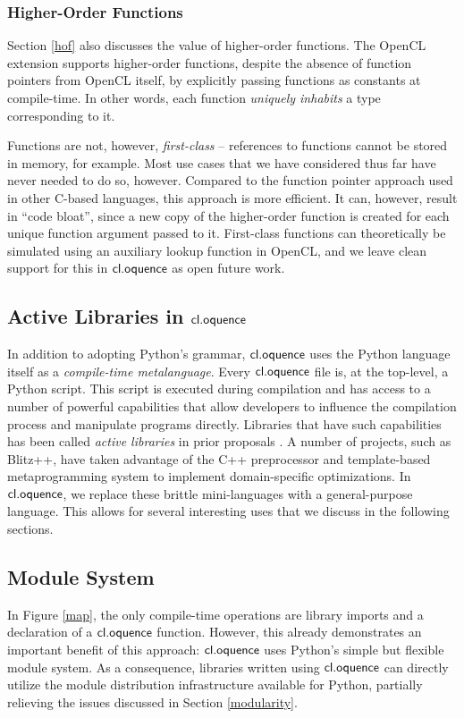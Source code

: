 \documentclass[10pt, conference, compsocconf]{IEEEtran}
\begin{document}
\subsubsection{Higher-Order Functions}
Section \ref{hof} also discusses the value of higher-order functions. The OpenCL extension supports higher-order functions, despite the absence of function pointers from OpenCL itself, by explicitly passing functions as constants at compile-time. In other words, each function {\it uniquely inhabits} a type corresponding to it.

Functions are not, however, {\it first-class} -- references to functions cannot be stored in memory, for example. Most use cases that we have considered thus far have never needed to do so, however. Compared to the function pointer approach used in other C-based languages, this approach is more efficient. It can, however, result in ``code bloat'', since a new copy of the higher-order function is created for each unique function argument passed to it. First-class functions can theoretically be simulated using an auxiliary lookup function in OpenCL, and we leave clean support for this in $\textsf{cl.oquence}$ as open future work.

\subsection{Active Libraries in $\textsf{cl.oquence}$}
In addition to adopting Python's grammar, $\textsf{cl.oquence}$ uses the Python language itself as a {\it compile-time metalanguage}. Every $\textsf{cl.oquence}$ file is, at the top-level, a Python script. This script is executed during compilation and has access to a number of powerful capabilities that allow developers to influence the compilation process and manipulate programs directly. Libraries that have such capabilities has been called {\it active libraries} in prior proposals \cite{activelibraries}. A number of  projects, such as Blitz++, have taken advantage of the C++ preprocessor and template-based metaprogramming system to implement domain-specific optimizations. In $\textsf{cl.oquence}$, we replace these brittle mini-languages with a general-purpose language. This allows for several interesting uses that we discuss in the following sections.

\subsection{Module System}
In Figure \ref{map}, the only compile-time operations are library imports and a declaration of a $\textsf{cl.oquence}$ function. However, this already demonstrates an important benefit of this approach: $\textsf{cl.oquence}$ uses Python's simple but flexible module system. As a consequence, libraries written using $\textsf{cl.oquence}$ can directly utilize the module distribution infrastructure available for Python, partially relieving the issues discussed in Section \ref{modularity}.
\end{document}
